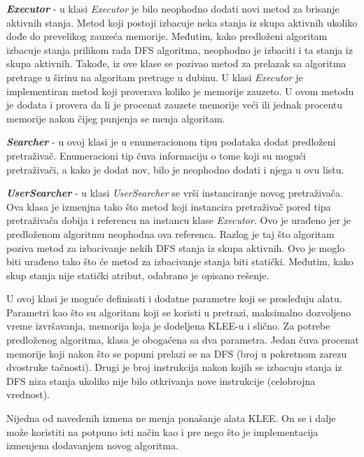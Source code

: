 \documentclass[12pt,oneside]{memoir}
\begin{document}
\begin{description}
    \item \textbf{\textit{Executor}} - u klasi \textit{Executor} je bilo neophodno dodati novi metod za brisanje aktivnih stanja. Metod koji postoji izbacuje neka stanja iz skupa aktivnih ukoliko dođe do prevelikog zauzeća memorije. Međutim, kako predloženi algoritam izbacuje stanja prilikom rada DFS algoritma, neophodno je izbaciti i ta stanja iz skupa aktivnih. Takođe, iz ove klase se pozivao metod za prelazak sa algoritma pretrage u širinu na algoritam pretrage u dubinu. U klasi \textit{Executor} je implementiran metod koji proverava koliko je memorije zauzeto. U ovom metodu je dodata i provera da li je procenat zauzete memorije veći ili jednak procentu memorije nakon čijeg punjenja se menja algoritam.
    
    \item \textbf{\textit{Searcher}} - u ovoj klasi je u enumeracionom tipu podataka dodat predloženi pretraživač. Enumeracioni tip čuva informaciju o tome koji su mogući pretraživači, a kako je dodat nov, bilo je neophodno dodati i njega u ovu listu.
    
    \item \textbf{\textit{UserSearcher}} \label{userSearcher} - u klasi \textit{UserSearcher} se vrši instanciranje novog pretraživača. Ova klasa je izmenjna tako što metod koji instancira pretraživač pored tipa pretraživača dobija i referencu na instancu klase \textit{Executor}. Ovo je urađeno jer je predloženom algoritmu neophodna ova referenca. Razlog je taj što algoritam poziva metod za izbacivanje nekih DFS stanja iz skupa aktivnih. Ovo je moglo biti urađeno tako što će metod za izbacivanje stanja biti statički. Međutim, kako skup stanja nije statički atribut, odabrano je opisano rešenje. 
    
    U ovoj klasi je moguće definisati i dodatne parametre koji se prosleđuju alatu. Parametri kao što su algoritam koji se koristi u pretrazi, maksimalno dozvoljeno vreme izvršavanja, memorija koja je dodeljena KLEE-u i slično. Za potrebe predloženog algoritma, klasa je obogaćena sa dva parametra. Jedan čuva procenat memorije koji nakon što se popuni prelazi se na DFS (broj u pokretnom zarezu dvostruke tačnosti). Drugi je broj instrukcija nakon kojih se izbacuju stanja iz DFS niza stanja ukoliko nije bilo otkrivanja nove instrukcije (celobrojna vrednost).
\end{description}

Nijedna od navedenih izmena ne menja ponašanje alata KLEE. On se i dalje može koristiti na potpuno isti način kao i pre nego što je implementacija izmenjena dodavanjem novog algoritma.
\end{document}
